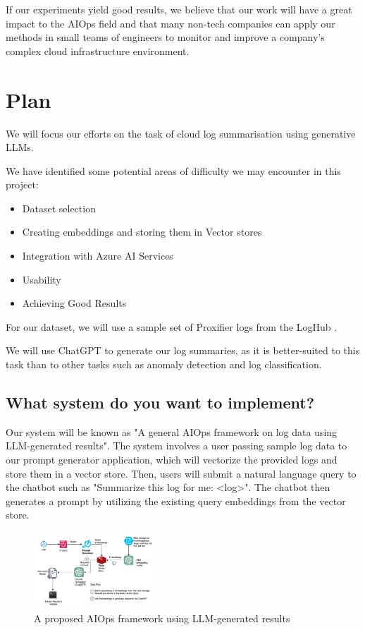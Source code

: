 \documentclass[conference]{IEEEtran}
\begin{document}
If our experiments yield good results, we believe that our work will have a great impact to the AIOps field and that many non-tech companies can apply our methods in small teams of engineers to monitor and improve a company's complex cloud infrastructure environment.

\section{Plan}
We will focus our efforts on the task of cloud log summarisation using generative LLMs.

We have identified some potential areas of difficulty we may encounter in this project:
\begin{itemize}
    \item Dataset selection
    \item Creating embeddings and storing them in Vector stores
    \item Integration with Azure AI Services
    \item Usability
    \item Achieving Good Results
\end{itemize}

For our dataset, we will use a sample set of Proxifier logs from the LogHub \cite{zhu2023loghub}.

We will use ChatGPT to generate our log summaries, as it is better-suited to this task than to other tasks such as anomaly detection and log classification.

\subsection{What system do you want to implement?}
Our system will be known as "A general AIOps framework on log data using LLM-generated results". The system involves a user passing sample log data to our prompt generator application, which will vectorize the provided logs and store them in a vector store. Then, users will submit a natural language query to the chatbot such as "Summarize this log for me: <log>". The chatbot then generates a prompt by utilizing the existing query embeddings from the vector store.

\begin{figure}[ht]
    \centering
    \includegraphics[width=0.4\textwidth]{arch.png}
    \caption{A proposed AIOps framework using LLM-generated results}
    \label{fig:arch}
\end{figure} 
\end{document}
